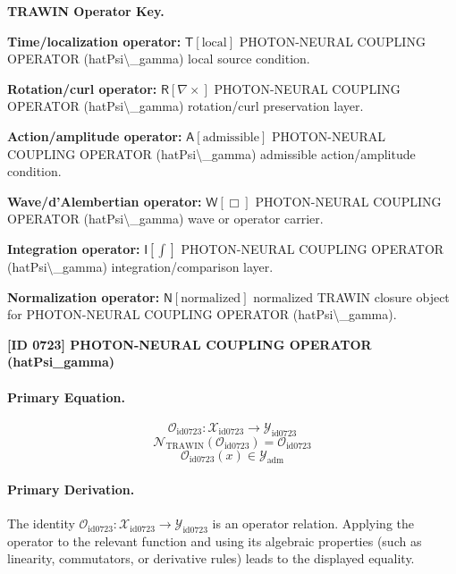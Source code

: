 \par\vspace{0.45\baselineskip}
\noindent\begin{minipage}[t]{\linewidth}
\begingroup
\small
\raggedright
\textbf{TRAWIN Operator Key.}\par
\noindent\textbf{Time/localization operator:} $\mathsf{T}\!\left[\mathrm{local}\right]$ PHOTON-NEURAL COUPLING OPERATOR (hatPsi\textbackslash{}\_gamma) local source condition.\par
\noindent\textbf{Rotation/curl operator:} $\mathsf{R}\!\left[\nabla\times\right]$ PHOTON-NEURAL COUPLING OPERATOR (hatPsi\textbackslash{}\_gamma) rotation/curl preservation layer.\par
\noindent\textbf{Action/amplitude operator:} $\mathsf{A}\!\left[\mathrm{admissible}\right]$ PHOTON-NEURAL COUPLING OPERATOR (hatPsi\textbackslash{}\_gamma) admissible action/amplitude condition.\par
\noindent\textbf{Wave/d'Alembertian operator:} $\mathsf{W}\!\left[\Box\right]$ PHOTON-NEURAL COUPLING OPERATOR (hatPsi\textbackslash{}\_gamma) wave or operator carrier.\par
\noindent\textbf{Integration operator:} $\mathsf{I}\!\left[\int\right]$ PHOTON-NEURAL COUPLING OPERATOR (hatPsi\textbackslash{}\_gamma) integration/comparison layer.\par
\noindent\textbf{Normalization operator:} $\mathsf{N}\!\left[\mathrm{normalized}\right]$ normalized TRAWIN closure object for PHOTON-NEURAL COUPLING OPERATOR (hatPsi\textbackslash{}\_gamma).\par
\endgroup
\end{minipage}

\clearpage
\noindent\textbf{[ID 0723] PHOTON-NEURAL COUPLING OPERATOR (hatPsi\_gamma)}\par
\vspace{0.35em}
\paragraph{Primary Equation.}
\[
\mathcal{O}_{\mathrm{id0723}}:\mathcal{X}_{\mathrm{id0723}}\longrightarrow\mathcal{Y}_{\mathrm{id0723}}
\]
\[
\mathcal{N}_{\mathrm{TRAWIN}}(\mathcal{O}_{\mathrm{id0723}})=\mathcal{O}_{\mathrm{id0723}}
\]
\[
\mathcal{O}_{\mathrm{id0723}}(x)\in\mathcal{Y}_{\mathrm{adm}}
\]

\paragraph{Primary Derivation.}
The identity \( \mathcal{O}_{\mathrm{id0723}}:\mathcal{X}_{\mathrm{id0723}}\longrightarrow\mathcal{Y}_{\mathrm{id0723}} \) is an operator relation. Applying the operator to the relevant function and using its algebraic properties (such as linearity, commutators, or derivative rules) leads to the displayed equality.

